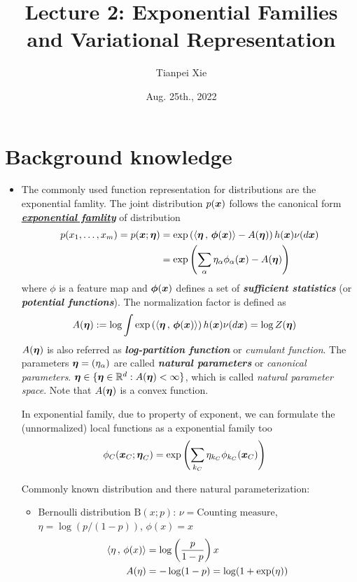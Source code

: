 \documentclass[11pt]{article}
\begin{document}
\title{Lecture 2:  Exponential Families and Variational Representation}
\author{ Tianpei Xie}
\date{Aug. 25th., 2022 }
\maketitle
\tableofcontents
\newpage
\allowdisplaybreaks
\section{Background knowledge}
\begin{itemize}
\item  The commonly used function representation for distributions are the exponential famlity. The joint distribution $p(\boldsymbol{x})$ follows the canonical form \underline{\emph{\textbf{exponential famlity}}} of distribution
\begin{align}
p(x_1, \ldots, x_{m}) = p(\boldsymbol{x}; \boldsymbol{\eta}) &= \exp\left(\left\langle \boldsymbol{\eta}\,,\, \boldsymbol{\phi}(\boldsymbol{x}) \right\rangle - A(\boldsymbol{\eta})\right)h(\boldsymbol{x})\nu(d\boldsymbol{x}) \nonumber \\
&= \exp\left(\sum_{\alpha}\eta_{\alpha}\phi_{\alpha}(\boldsymbol{x}) -  A(\boldsymbol{\eta})\right) \label{eqn: exp_fam}
\end{align} where $\phi$ is a feature map  and $\boldsymbol{\phi}(\boldsymbol{x})$ defines a set of \emph{\textbf{sufficient statistics}} (or \emph{\textbf{potential functions}}). The normalization factor is defined as
\begin{align*}
 A(\boldsymbol{\eta}) &:= \log \int \exp\left( \left\langle \boldsymbol{\eta}\,,\, \boldsymbol{\phi}(\boldsymbol{x}) \right\rangle \right)h(\boldsymbol{x})\nu(d\boldsymbol{x}) = \log Z(\boldsymbol{\eta})
\end{align*} $A(\boldsymbol{\eta})$ is also referred as \textbf{\emph{log-partition function}} or \emph{cumulant function}. The parameters $\boldsymbol{\eta} = (\eta_{\alpha})$ are called \textbf{\emph{natural parameters}}  or \emph{canonical parameters}. $\boldsymbol{\eta} \in \{\boldsymbol{\eta} \in {\mathbb R}^{d}: A(\boldsymbol{\eta}) < \infty\}$, which is called \emph{natural parameter space}. Note that $A(\boldsymbol{\eta})$ is a convex function. 

In exponential family, due to property of exponent, we can formulate the (unnormalized) local functions as a exponential family too
\begin{align*}
\phi_{C}(\boldsymbol{x}_{C}; \boldsymbol{\eta}_{C}) &= \exp\left(\sum_{k_{C}}\eta_{k_{C}}\phi_{k_{C}}(\boldsymbol{x}_{C})\right)
\end{align*}

Commonly known distribution and there natural parameterization:
\begin{itemize}
\item Bernoulli distribution $\text{B}(x; p)$: $\nu = \text{Counting measure}$,  $\eta = \log(p/(1-p))$, $\phi(x) = x$
\begin{align*}
\left\langle \eta\,,\, \phi(x) \right\rangle &= \log\left(\frac{p}{1-p}\right)x\\
A(\eta) &=-\log(1-p) =  \log(1 + \exp(\eta))  
\end{align*}


\end{itemize}
\end{itemize}
\end{document}
